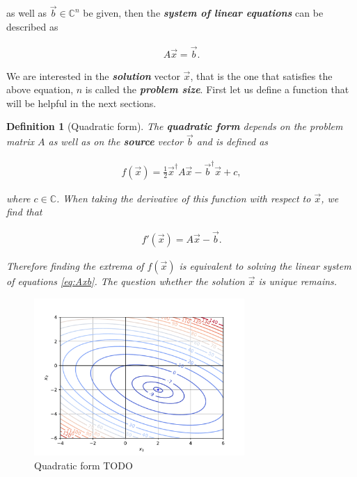 \documentclass{article}
\theoremstyle{plain} %
\newtheorem{definition}{Definition}[section]
\theoremstyle{convention} %
\theoremstyle{remark} %
\def\df#1{\textbf{\textit{#1}}}
\numberwithin{equation}{section}
\begin{document}
as well as $\vec{b} \in \mathbb{C}^n$ be given, then the \df{system of linear equations} can be described as

\begin{align}
    A \vec{x} = \vec{b}. \label{eq:Axb}
\end{align}

We are interested in the \df{solution} vector $\vec{x}$, that is the one that satisfies the above equation, $n$ is called the \df{problem size}. First let us define a function that will be helpful in the next sections.

\begin{definition}[Quadratic form]

The \df{quadratic form} depends on the problem matrix $A$ as well as on the \df{source} vector $\vec{b}$ and is defined as

\begin{align*}
    f(\vec{x}) = \frac{1}{2} \vec{x}^{\dagger} A \vec{x} - \vec{b}^{\dagger} \vec{x} + c,
\end{align*}

where $c \in \mathbb{C}$. When taking the derivative of this function with respect to $\vec{x}$, we find that

\begin{align*}
    f'(\vec{x}) = A \vec{x} - \vec{b}.
\end{align*}

Therefore finding the extrema of $f(\vec{x})$ is equivalent to solving the linear system of equations \eqref{eq:Axb}. The question whether the solution $\vec{x}$ is unique remains.

\end{definition}

\begin{figure}
    \centering
    \includegraphics[width=8cm]{plots/qform_contour}
    \caption{Quadratic form TODO}
    \label{fig:qform}
\end{figure}
\end{document}
